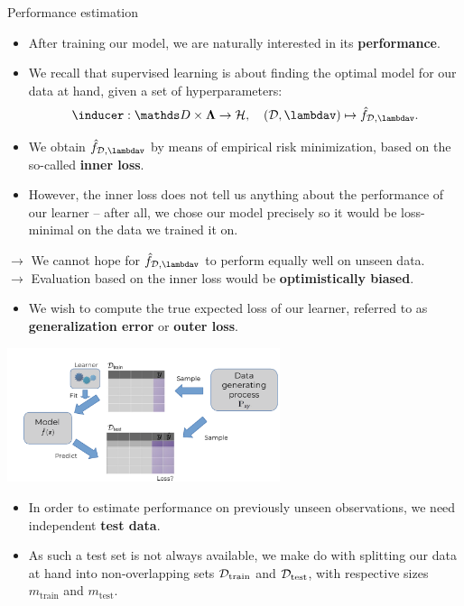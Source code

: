\documentclass[11pt,compress,t,notes=noshow, xcolor=table]{beamer}
\begin{document}
\begin{vbframe}{Performance estimation}

\begin{itemize}
  \item After training our model, we are naturally interested in its
  \textbf{performance}.
  \item We recall that supervised learning is about finding the optimal model 
  for our data at hand, given a set of hyperparameters: 
  $$\inducer: \preimageInducerShort \rightarrow \Hspace, \quad (\D, \lambdav)
  \mapsto \fh_{\D, \lambdav}.$$
  \item We obtain $\fh_{\D, \lambdav}$ by means of empirical risk minimization, 
  based on the so-called \textbf{inner loss}.
  \item However, the inner loss does not tell us anything about the performance 
  of our learner -- after all, we chose our model precisely so it would be 
  loss-minimal on the data we trained it on.
\end{itemize}

\lz
$\rightarrow$ We cannot hope for $\fh_{\D, \lambdav}$ to perform equally well 
on unseen data. \\
$\rightarrow$ Evaluation based on the inner loss would be 
\textbf{optimistically biased}.

\framebreak

\begin{itemize}
  \item We wish to compute the true expected loss of our learner, referred to as
  \textbf{generalization error} or \textbf{outer loss}.
\end{itemize}

\begin{center}
\includegraphics[width=0.6\textwidth]{figure_man/evaluation-intro-ge.pdf}
\end{center}

\begin{itemize}
  \item In order to estimate performance on previously unseen observations, we 
  need independent \textbf{test data}. 
  \item As such a test set is not always available, we make do with 
  splitting our data at hand into non-overlapping sets $\mathcal{D}_{\text{train}}$ and $\mathcal{D}_{\text{test}}$, 
  with respective sizes $m_{\mathrm{train}}$ and $m_{\mathrm{test}}$.
\end{itemize}

\end{vbframe}
\end{document}
